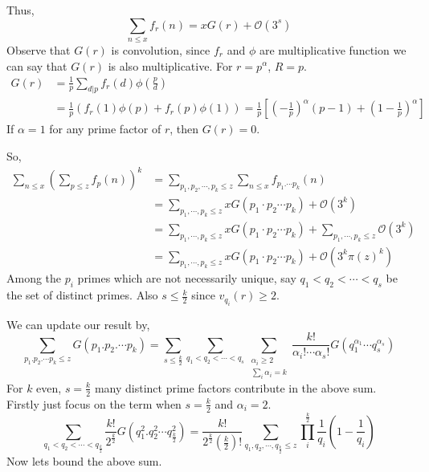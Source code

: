 \documentclass{beamer}
\numberwithin{theorem}{section}
\theoremstyle{definition}
\begin{document}
\begin{frame}%
Thus,
$$\sum_{n\le x}f_r(n)=xG(r)+\mathcal{O}(3^s)$$
Observe that $G(r)$ is convolution, since $f_r$ and $\phi$ are multiplicative function we can say that $G(r)$ is also multiplicative. For $r=p^{\alpha}$, $R=p$.
\begin{align*}
    G(r)&=\frac{1}{p}\sum_{d|p}f_r(d)\phi\left(\frac{p}{d}\right)\\ 
    &=\frac{1}{p}\left(f_r(1)\phi(p)+f_r(p)\phi(1)\right)=\frac{1}{p}\left[\left(-\frac{1}{p}\right)^{\alpha}(p-1)+\left(1-\frac{1}{p}\right)^{\alpha}\right]
\end{align*}
If $\alpha =1$ for any prime factor of $r$, then $G(r)=0$.

    
\end{frame}
\begin{frame}{}
So,
\begin{align*}
    \sum_{n\le x}\left(\sum_{p\le z}f_p(n)\right)^k&=\sum_{p_1,p_2,\cdots, p_k\le z}\sum_{n\le x}f_{p_1.\cdots p_k}(n)\\ &=\sum_{p_1,\cdots,p_k\le z}xG(p_1\cdot p_2\cdots p_k)+\mathcal{O}(3^k) \\&=\sum_{p_1,\cdots,p_k\le z}xG(p_1\cdot p_2\cdots p_k)+\sum_{p_1,\cdots ,p_k\le z}\mathcal{O}(3^k) \\
    &=\sum_{p_1,\cdots,p_k\le z}xG(p_1\cdot p_2\cdots p_k)+\mathcal{O}(3^k\pi(z)^k) 
\end{align*}
Among the $p_i$ primes which are not necessarily unique, say $q_1<q_2<\cdots<q_s$ be the set of distinct primes. Also $s\le \frac{k}{2}$ since $v_{q_i}(r)\ge 2$.
    
\end{frame}
\begin{frame}[shrink=7]
We can update our result by,
$$\sum_{p_1.p_2.\cdots p_k\le z}G(p_1.p_2.\cdots p_k)=\sum_{s\le \frac{k}{2}}\sum_{q_1<q_2<\cdots <q_s}\sum\limits_{\substack{\alpha_i\ge 2\\ \sum_{i}\alpha_i=k}}\frac{k!}{\alpha_i!\cdots \alpha_s!}G(q_1^{\alpha_1}\cdots q_s^{\alpha_s})$$
For $k$ even, $s=\frac{k}{2}$ many distinct prime factors contribute in the above sum. Firstly just focus on the term when $s=\frac{k}{2}$ and $\alpha_i=2$.
$$\sum_{q_1<q_2<\cdots <q_{\frac{k}{2}}}\frac{k!}{2^{\frac{k}{2}}}G(q_1^2.q_2^2\cdots q_{\frac{k}{2}}^2)=\frac{k!}{2^{\frac{k}{2}}\left(\frac{k}{2}\right)!}\sum_{q_1,q_2,\cdots,q_{\frac{k}{2}}\le z}\prod_{i}^{\frac{k}{2}}\frac{1}{q_i}\left(1-\frac{1}{q_i}\right)$$
Now lets bound the above sum. 
\end{frame}
\end{document}
